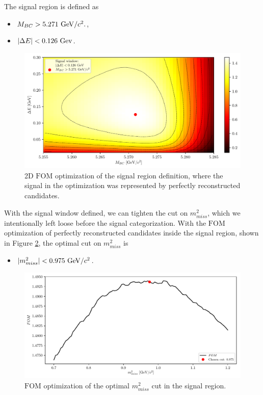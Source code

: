 The signal region is defined as
\begin{itemize}
	\item $M_{BC} > 5.271\mathrm{~GeV}/c^2.$,
	\item $\vert \Delta E \vert < 0.126\mathrm{~Gev}$. 
\end{itemize}

\begin{figure}[H]
	\centering
	\captionsetup{width=0.8\linewidth}
	\includegraphics[width=\linewidth]{fig/sigWin}
	\caption{2D $\mathrm{FOM}$ optimization of the signal region definition, where the signal in the optimization was represented by perfectly reconstructed candidates.}
	\label{fig:sigwin}
\end{figure}

With the signal window defined, we can tighten the cut on $m_{miss}^2$, which we intentionally left loose before the signal categorization. With the $\mathrm{FOM}$ optimization of perfectly reconstructed candidates inside the signal region, shown in Figure \ref{fig:missm2opt}, the optimal cut on $m_{miss}^2$ is 

\begin{itemize}
	\item $\vert m_{miss}^2 \vert < 0.975\mathrm{~GeV}/c^2$.
\end{itemize}

\begin{figure}[H]
	\centering
	\captionsetup{width=0.8\linewidth}
	\includegraphics[width=\linewidth]{fig/missM2_precise}
	\caption{$\mathrm{FOM}$ optimization of the optimal $m_{miss}^2$ cut in the signal region.}
	\label{fig:missm2opt}
\end{figure}

